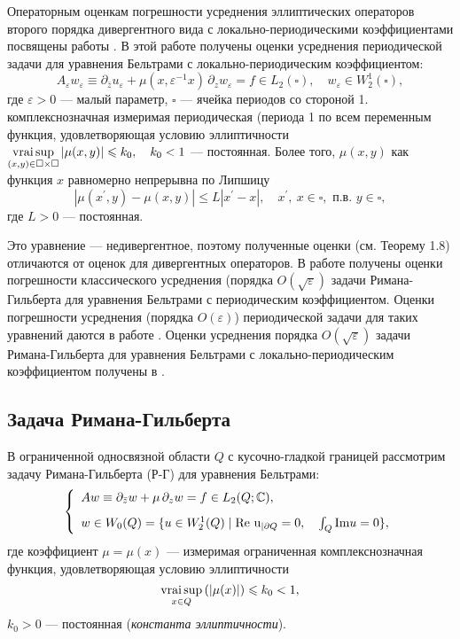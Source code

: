 \documentclass[a4paper,12pt]{article}
\theoremstyle{definition}
\begin{document}
Операторным оценкам погрешности усреднения  эллиптических операторов второго порядка дивергентного вида  с локально-периодическими коэффициентами посвящены работы \cite{smm-4,smm-5,smm-6,smm-7}.
В этой работе получены оценки усреднения периодической задачи  для уравнения Бельтрами с локально-периодическим коэффициентом:
$$
	A_\varepsilon w_\varepsilon\equiv\partial_{\bar{z}}u_\varepsilon+\mu(x,\varepsilon^{-1}x)\,\partial_z w_\varepsilon
=f\in L_2(\square),\quad w_\varepsilon\in W_2^1(\square),
$$
где $\varepsilon>0$ --- малый параметр, $\square$ --- ячейка периодов со стороной 1.
комплекснозначная измеримая периодическая (периода 1 по всем переменным   функция, удовлетворяющая условию эллиптичности
 $\mathop{\rm vrai\, sup}\limits_{(x,y)\in\square\times\square}|\mu(x,y)|\leqslant k_0,\quad k_0<1$  --- постоянная.
 Более того, $\mu(x,y)$  как функция $x$ равномерно непрерывна по Липшицу
$$
|\mu(x^\prime,y)-\mu(x,y)|\leqslant L|x^\prime-x|,\quad x^\prime,\ x\in\square,  \text{ \ п.в.\ }   y\in\square,
$$
где $L>0$ --- постоянная.

Это уравнение --- недивергентное, поэтому полученные оценки (см. Теорему 1.8) отличаются от оценок для дивергентных операторов.
В работе \cite{smm-8} получены оценки погрешности классического усреднения (порядка  $O(\sqrt\varepsilon)$ задачи Римана-Гильберта  для уравнения Бельтрами с периодическим коэффициентом. Оценки погрешности усреднения (порядка $O(\varepsilon)$) периодической задачи для таких уравнений даются в работе \cite{smm-9}.  Оценки усреднения  порядка $O(\sqrt\varepsilon)$  задачи Римана-Гильберта для уравнения Бельтрами с локально-периодическим коэффициентом получены  в \cite{smm-10}.



 \subsection{Задача Римана-Гильберта} 
 В ограниченной односвязной области $Q$ с кусочно-гладкой границей рассмотрим задачу Римана-Гильберта (Р-Г) для уравнения Бельтрами:
\begin{equation}\label{f:1.001}
	\left\{\begin{array}{l}
		A w\equiv\partial_{\bar{z}}w+\mu\,\partial_z w=f\in L_2(Q;\mathbb{C}), \\[3mm]
		w\in W_0(Q)=\{u\in W_2^1(Q) \mid {\rm Re\ u}_{|\partial Q}=0,\quad \int_Q\text{\rm Im} u=0\},
	\end{array}\right.
\end{equation}
где коэффициент $\mu=\mu(x)$ --- измеримая ограниченная комплекснозначная функция, удовлетворяющая условию эллиптичности
\begin{equation}\label{f:1.2}
	\mathop{\rm vrai\,sup}_{x\in Q}\left(|\mu(x)|\right)\leqslant k_0 <1,
\end{equation}
$k_0>0$ --- постоянная (\textit{константа эллиптичности}).
\end{document}
